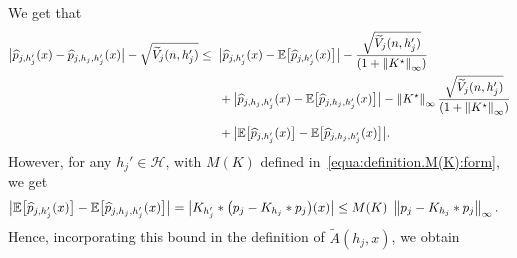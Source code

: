 \documentclass[11pt,a4paper,openany]{article}
\def\R{\mathbb{R}}
\def\E{\mathbb{E}}
\begin{document}
We get that
	\begin{align*}
		\big| \widehat{p}_{j,h_{j}'}(x)  -  \widehat{p}_{j, h_{j} ,h_{j}'}(x) \big| -   \sqrt{\widetilde{V}_{j}(n,h_{j}')}   
		\leq    &\hspace{0.2cm}  \big| \widehat{p}_{j,h_{j}'}(x)  -  \E \big[ \widehat{p}_{j,h_{j}'}(x) \big]  \big|  
		-    \dfrac{\sqrt{\widetilde{V}_{j}(n,h_{j}')}}{ (1 + \left\| K^{\star} \right\|_{\infty} ) }
		\\
		& \hspace{0.2cm}  +  \big| \widehat{p}_{j, h_{j} ,h_{j}'}(x) - \E \big[ \widehat{p}_{j, h_{j} ,h_{j}'}(x) \big] \big|  
		-  \left\| K^{\star} \right\|_{\infty}     \dfrac{\sqrt{\widetilde{V}_{j}(n,h_{j}')}}{ (1 + \left\| K^{\star} \right\|_{\infty} ) }
		\\[0.2cm]  
		& \hspace{0.2cm} +  \big| \E \big[ \widehat{p}_{j,h_{j}'}(x) \big]  -  \E \big[ \widehat{p}_{j, h_{j} ,h_{j}'}(x) \big] \big|.
	\end{align*}
	However, for any $h_{j}' \in \mathcal{H}$, with $M(K)$ %
	defined in~\eqref{equa:definition.M(K):form},  %
	we get  
	\begin{align}\label{uniformbias}
		\big| \E \big[ \widehat{p}_{j,h_{j}'}(x) \big]  -  \E \big[ \widehat{p}_{j, h_{j} ,h_{j}'}(x) \big] \big|  &=  \big| K_{h_{j}'}* \big( p_{j} - K_{h_{j}}*p_{j} \big)(x) \big|  
		\leq  M(K)  \hspace{0.1cm}   %
		\left\| p_{j} - K_{h_{j}} \ast  p_{j}   \right\|_{\infty}
		. 
	\end{align}
	Hence, %
	incorporating this bound in the definition of $\widetilde A(h_{j} , x )$, we obtain
\end{document}
